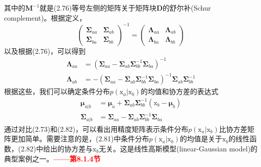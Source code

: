 \documentclass[b5paper]{book}
\numberwithin{equation}{chapter}
\newcommand {\bx} {\boldsymbol{\mathrm{x}}}
\newcommand {\bfMu} {\boldsymbol{\mu}}
\newcommand {\bfSigma} {\boldsymbol{\Sigma}}
\newcommand {\bfLambda} {\boldsymbol{\Lambda}}
\begin{document}
{{\[	\]}
	其中的$\mathbf{M}^{-1}$就是(2.76)等号左侧的矩阵关于矩阵块$\mathbf{D}$的舒尔补(Schur complement)。根据定义，
	\begin{equation}
		\left(\begin{matrix}\bfSigma_{aa} & \bfSigma_{ab} \\ \bfSigma_{ba} & \bfSigma_{bb}\end{matrix}\right)^{-1} = \left(\begin{matrix}\bfLambda_{aa} & \bfLambda_{ab} \\ \bfLambda_{ba} & \bfLambda_{bb}\end{matrix}\right)
	\end{equation}
	以及根据(2.76)，可以得到
	\begin{align}
		\bfLambda_{aa}&=(\bfSigma_{aa}-\bfSigma_{ab}\bfSigma_{bb}^{-1}\bfSigma_{ba})^{-1}\\
		\bfLambda_{ab}&=-(\bfSigma_{aa}-\bfSigma_{ab}\bfSigma_{bb}^{-1}\bfSigma_{ba})^{-1}\bfSigma_{ab}\bfSigma_{bb}^{-1}
	\end{align}
	根据这些，我们可以确定条件分布$p(\bx_a|\bx_b)$的均值和协方差的表达式
	\begin{align}
		\bfMu_{a|b}&=\bfMu_a + \bfSigma_{ab}\bfSigma_{bb}^{-1}(\bx_b-\bfMu_b) \\
		\bfSigma_{a|b}&=\bfSigma_{aa}-\bfSigma_{ab}\bfSigma_{bb}^{-1}\bfSigma_{ba}
	\end{align}
	通过对比(2.73)和(2.82)，可以看出用精度矩阵表示条件分布$p(\bx_a|\bx_b)$比协方差矩阵更加简单。需要注意的是，(2.81)中条件分布$p(\bx_a|\bx_b)$的均值是关于$\bx_b$的线性函数，(2.82)中给出的协方差与$\bx_b$无关。这是线性高斯模型(linear-Gaussian model)的典型案例之一。\textcolor{red}{\textbf{——第8.1.4节}}
	}
\end{document}
